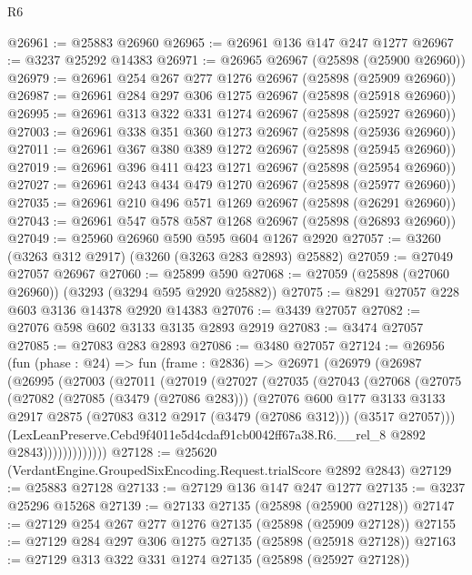 \begin{lexlean}{R6}
\begin{coremodule}
@26961 := @25883 @26960
@26965 := @26961 @136 @147 @247 @1277
@26967 := @3237 @25292 @14383
@26971 := @26965 @26967 (@25898 (@25900 @26960))
@26979 := @26961 @254 @267 @277 @1276 @26967 (@25898 (@25909 @26960))
@26987 := @26961 @284 @297 @306 @1275 @26967 (@25898 (@25918 @26960))
@26995 := @26961 @313 @322 @331 @1274 @26967 (@25898 (@25927 @26960))
@27003 := @26961 @338 @351 @360 @1273 @26967 (@25898 (@25936 @26960))
@27011 := @26961 @367 @380 @389 @1272 @26967 (@25898 (@25945 @26960))
@27019 := @26961 @396 @411 @423 @1271 @26967 (@25898 (@25954 @26960))
@27027 := @26961 @243 @434 @479 @1270 @26967 (@25898 (@25977 @26960))
@27035 := @26961 @210 @496 @571 @1269 @26967 (@25898 (@26291 @26960))
@27043 := @26961 @547 @578 @587 @1268 @26967 (@25898 (@26893 @26960))
@27049 := @25960 @26960 @590 @595 @604 @1267 @2920
@27057 := @3260 (@3263 @312 @2917) (@3260 (@3263 @283 @2893) @25882)
@27059 := @27049 @27057 @26967
@27060 := @25899 @590
@27068 := @27059 (@25898 (@27060 @26960)) (@3293 (@3294 @595 @2920 @25882))
@27075 := @8291 @27057 @228 @603 @3136 @14378 @2920 @14383
@27076 := @3439 @27057
@27082 := @27076 @598 @602 @3133 @3135 @2893 @2919
@27083 := @3474 @27057
@27085 := @27083 @283 @2893
@27086 := @3480 @27057
@27124 := @26956
    (fun (phase : @24) =>
    fun (frame : @2836) =>
    @26971
      (@26979
        (@26987
          (@26995
            (@27003
              (@27011
                (@27019
                  (@27027
                    (@27035
                      (@27043
                        (@27068
                          (@27075
                            (@27082
                              (@27085 (@3479 (@27086 @283)))
                              (@27076
                                @600
                                @177
                                @3133
                                @3133
                                @2917
                                @2875
                                (@27083 @312 @2917 (@3479 (@27086 @312)))
                                (@3517 @27057)))
                            (LexLeanPreserve.Cebd9f4011e5d4cdaf91cb0042ff67a38.R6.__rel_8
                              @2892
                              @2843)))))))))))))
@27128 := @25620 (VerdantEngine.GroupedSixEncoding.Request.trialScore @2892 @2843)
@27129 := @25883 @27128
@27133 := @27129 @136 @147 @247 @1277
@27135 := @3237 @25296 @15268
@27139 := @27133 @27135 (@25898 (@25900 @27128))
@27147 := @27129 @254 @267 @277 @1276 @27135 (@25898 (@25909 @27128))
@27155 := @27129 @284 @297 @306 @1275 @27135 (@25898 (@25918 @27128))
@27163 := @27129 @313 @322 @331 @1274 @27135 (@25898 (@25927 @27128))

\end{coremodule}
\end{lexlean}
